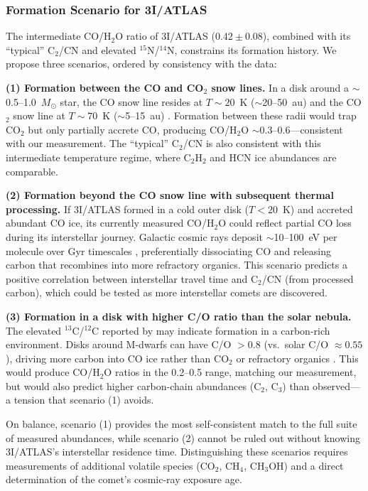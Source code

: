 \documentclass[preprint2]{aastex631}
\begin{document}
\subsubsection{Formation Scenario for 3I/ATLAS}

The intermediate CO/H$_2$O ratio of 3I/ATLAS ($0.42 \pm 0.08$), combined with its ``typical'' C$_2$/CN and elevated $^{15}$N/$^{14}$N, constrains its formation history. We propose three scenarios, ordered by consistency with the data:

\textbf{(1) Formation between the CO and CO$_2$ snow lines.} In a disk around a $\sim$0.5--1.0~$M_\odot$ star, the CO snow line resides at $T \sim 20$~K ($\sim$20--50~au) and the CO$_2$ snow line at $T \sim 70$~K ($\sim$5--15~au) \citep{qi15}. Formation between these radii would trap CO$_2$ but only partially accrete CO, producing CO/H$_2$O $\sim 0.3$--0.6---consistent with our measurement. The ``typical'' C$_2$/CN is also consistent with this intermediate temperature regime, where C$_2$H$_2$ and HCN ice abundances are comparable.

\textbf{(2) Formation beyond the CO snow line with subsequent thermal processing.} If 3I/ATLAS formed in a cold outer disk ($T < 20$~K) and accreted abundant CO ice, its currently measured CO/H$_2$O could reflect partial CO loss during its interstellar journey. Galactic cosmic rays deposit $\sim$10--100~eV per molecule over Gyr timescales \citep{gerakines01}, preferentially dissociating CO and releasing carbon that recombines into more refractory organics. This scenario predicts a positive correlation between interstellar travel time and C$_2$/CN (from processed carbon), which could be tested as more interstellar comets are discovered.

\textbf{(3) Formation in a disk with higher C/O ratio than the solar nebula.} The elevated $^{13}$C/$^{12}$C reported by \citet{opitom26} may indicate formation in a carbon-rich environment. Disks around M-dwarfs can have C/O $> 0.8$ (vs.\ solar C/O $\approx 0.55$), driving more carbon into CO ice rather than CO$_2$ or refractory organics \citep{bergin14}. This would produce CO/H$_2$O ratios in the 0.2--0.5 range, matching our measurement, but would also predict higher carbon-chain abundances (C$_2$, C$_3$) than observed---a tension that scenario (1) avoids.

On balance, scenario (1) provides the most self-consistent match to the full suite of measured abundances, while scenario (2) cannot be ruled out without knowing 3I/ATLAS's interstellar residence time. Distinguishing these scenarios requires measurements of additional volatile species (CO$_2$, CH$_4$, CH$_3$OH) and a direct determination of the comet's cosmic-ray exposure age.
\end{document}
